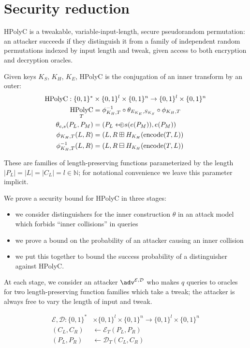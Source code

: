 \documentclass[letterpaper,luatex,11pt]{article}
\DeclareMathOperator{\encode}{encode}
\DeclareMathOperator{\HPolyC}{HPolyC}
\newcommand*{\arrowoplus}{\leftarrow\mkern-12mu\oplus}
\newcommand*{\calE}{\mathcal{E}}
\newcommand*{\calD}{\mathcal{D}}
\begin{document}
\section{Security reduction}
HPolyC is a tweakable, variable-input-length, secure pseudorandom permutation: an attacker
succeeds if they distinguish it from a family of independent random permutations indexed by
input length and tweak, given access to both encryption and decryption oracles.

Given keys $K_S$, $K_H$, $K_E$, HPolyC is the conjugation of an inner transform by an outer:
\begin{align*}
    \HPolyC:
    \{0,1\}^* &\times \{0,1\}^l \times \{0,1\}^n \rightarrow \{0,1\}^l \times \{0,1\}^n \\
    \HPolyC_{T} &= \phi^{-1}_{K_H, T}
    \circ \theta_{E_{K_E}, S_{K_S}} \circ \phi_{K_H, T} \\
    \theta_{e, s}(P_L, P_M) &= (P_L \arrowoplus s(e(P_M)), e(P_M)) \\
    \phi_{K_H, T}(L, R) &= (L, R \boxplus H_{K_H}(\encode(T, L)) \\
    \phi^{-1}_{K_H, T}(L, R) &= (L, R \boxminus H_{K_H}(\encode(T, L))
\end{align*}

These are families of length-preserving functions parameterized by the length
$|P_L| = |L| = |C_L| = l \in \mathbb{N}$;
for notational convenience we leave this parameter implicit.

We prove a security bound for HPolyC in three stages:
\begin{itemize}
    \item we consider distinguishers for the inner construction $\theta$ in an
    attack model which forbids ``inner collisions'' in queries
    \item we prove a bound on the probability of an attacker causing an inner collision
    \item we put this together to bound the success probability of a distinguisher against
    HPolyC.
\end{itemize}

At each stage, we consider an attacker \(\adv^{\calE, \calD}\) who makes $q$ queries
to oracles for
two length-preserving function families which take a tweak; the attacker is always free to vary
the length of input and tweak.

\begin{align*}
\calE, \calD:
\{0,1\}^* &\times \{0,1\}^l \times \{0,1\}^n \rightarrow \{0,1\}^l \times \{0,1\}^n \\
(C_L, C_R) &\leftarrow \calE_T(P_L, P_R) \\
(P_L, P_R) &\leftarrow \calD_T(C_L, C_R) \\
\end{align*}
\end{document}
